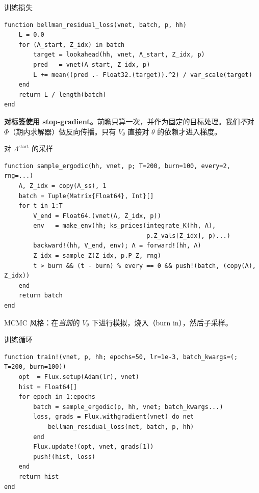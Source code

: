 \documentclass[10pt,aspectratio=169]{beamer}
\newcommand{\Lstart}{\Lambda^{\mathrm{start}}}
\begin{document}
\begin{frame}[fragile]{训练损失}
\begin{lstlisting}
function bellman_residual_loss(vnet, batch, p, hh)
    L = 0.0
    for (Λ_start, Z_idx) in batch
        target = lookahead(hh, vnet, Λ_start, Z_idx, p)
        pred   = vnet(Λ_start, Z_idx, p)
        L += mean((pred .- Float32.(target)).^2) / var_scale(target)
    end
    return L / length(batch)
end
\end{lstlisting}

\vspace{0.4em}

\textbf{对标签使用 stop-gradient。}前瞻只算一次，并作为固定的目标处理。我们\emph{不}对 $\Phi$（期内求解器）做反向传播。只有 $V_\theta$ 直接对 $\theta$ 的依赖才进入梯度。

\end{frame}

\begin{frame}[fragile]{对 $\Lstart$ 的采样}
\begin{lstlisting}
function sample_ergodic(hh, vnet, p; T=200, burn=100, every=2, rng=...)
    Λ, Z_idx = copy(Λ_ss), 1
    batch = Tuple{Matrix{Float64}, Int}[]
    for t in 1:T
        V_end = Float64.(vnet(Λ, Z_idx, p))
        env   = make_env(hh; ks_prices(integrate_K(hh, Λ),
                                       p.Z_vals[Z_idx], p)...)
        backward!(hh, V_end, env); Λ = forward!(hh, Λ)
        Z_idx = sample_Z(Z_idx, p.P_Z, rng)
        t > burn && (t - burn) % every == 0 && push!(batch, (copy(Λ), Z_idx))
    end
    return batch
end
\end{lstlisting}

MCMC 风格：在\emph{当前}的 $V_\theta$ 下进行模拟，烧入（burn in），然后子采样。

\end{frame}

\begin{frame}[fragile]{训练循环}
\begin{lstlisting}
function train!(vnet, p, hh; epochs=50, lr=1e-3, batch_kwargs=(; T=200, burn=100))
    opt  = Flux.setup(Adam(lr), vnet)
    hist = Float64[]
    for epoch in 1:epochs
        batch = sample_ergodic(p, hh, vnet; batch_kwargs...)
        loss, grads = Flux.withgradient(vnet) do net
            bellman_residual_loss(net, batch, p, hh)
        end
        Flux.update!(opt, vnet, grads[1])
        push!(hist, loss)
    end
    return hist
end
\end{lstlisting}
\end{frame}
\end{document}
